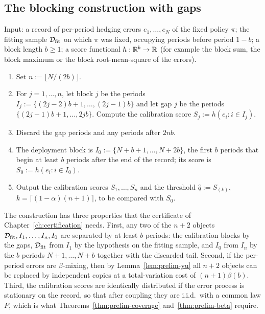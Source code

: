 \documentclass[../../../main.tex]{subfiles}
\begin{document}
\subsection{The blocking construction with gaps}

\begin{algorithmenv}\label{alg:prelim-blocking}
Input: a record of per-period hedging errors $e_1,\dots,e_N$ of the fixed policy $\pi$; the fitting sample $\mathcal D_{\mathrm{fit}}$ on which $\pi$ was fixed, occupying periods before period $1-b$; a block length $b\ge1$; a score functional $h:\mathbb{R}^b\to\mathbb{R}$ (for example the block sum, the block maximum or the block root-mean-square of the errors).
\begin{enumerate}[nosep,label=\arabic*.]
\item Set $n:=\lfloor N/(2b)\rfloor$.
\item For $j=1,\dots,n$, let block $j$ be the periods $I_j:=\{(2j-2)b+1,\dots,(2j-1)b\}$ and let gap $j$ be the periods $\{(2j-1)b+1,\dots,2jb\}$. Compute the calibration score $S_j:=h(e_i:i\in I_j)$.
\item Discard the gap periods and any periods after $2nb$.
\item The deployment block is $I_0:=\{N+b+1,\dots,N+2b\}$, the first $b$ periods that begin at least $b$ periods after the end of the record; its score is $S_0:=h(e_i:i\in I_0)$.
\item Output the calibration scores $S_1,\dots,S_n$ and the threshold $\hat q:=S_{(k)}$, $k=\lceil(1-\alpha)(n+1)\rceil$, to be compared with $S_0$.
\end{enumerate}
\end{algorithmenv}

The construction has three properties that the certificate of Chapter~\ref{ch:certification} needs. First, any two of the $n+2$ objects $\mathcal D_{\mathrm{fit}},I_1,\dots,I_n,I_0$ are separated by at least $b$ periods: the calibration blocks by the gaps, $\mathcal D_{\mathrm{fit}}$ from $I_1$ by the hypothesis on the fitting sample, and $I_0$ from $I_n$ by the $b$ periods $N+1,\dots,N+b$ together with the discarded tail. Second, if the per-period errors are $\beta$-mixing, then by Lemma~\ref{lem:prelim-yu} all $n+2$ objects can be replaced by independent copies at a total-variation cost of $(n+1)\beta(b)$. Third, the calibration scores are identically distributed if the error process is stationary on the record, so that after coupling they are i.i.d.\ with a common law $P$, which is what Theorems~\ref{thm:prelim-coverage} and~\ref{thm:prelim-beta} require.
\end{document}
